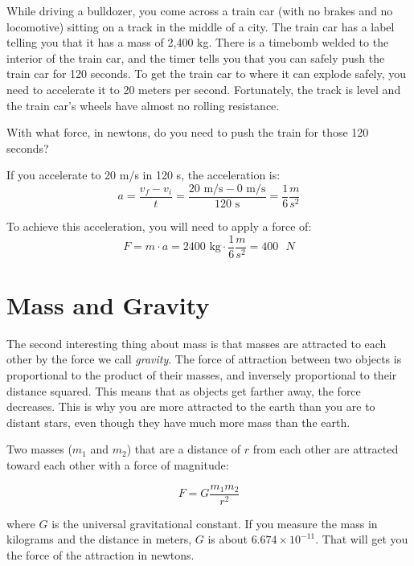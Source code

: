 \begin{Exercise}[title={Acceleration}, label=acceleration_train]

While driving a bulldozer, you come across a train car (with no brakes
and no locomotive) sitting on a track in the middle of a city. The train car
has a label telling you that it has a mass of 2,400 kg. There is a timebomb
welded to the interior of the train car, and the timer tells you that
you can safely push the train car for 120 seconds. To get the train
car to where it can explode safely, you need to accelerate it to 20 meters per
second. Fortunately, the track is level and the train car's wheels have
almost no rolling resistance.

With what force, in newtons, do you need to push the train for those 120 seconds?

\end{Exercise}
\begin{Answer}[ref=acceleration_train]
If you accelerate to 20 m/s in 120 s, the acceleration is:
$$a = \frac{v_f - v_i}{t} = \frac{20\text{ m/s} - 0\text{ m/s}}{120\text{ s}} = \frac{1}{6} \frac{m}{s^2}$$

To achieve this acceleration, you will need to apply a force of:
$$F = m \cdot a = 2400\text{ kg} \cdot \frac{1}{6} \frac{m}{s^2} = 400\text{ }N$$
\end{Answer}

\section{Mass and Gravity}

The second interesting thing about mass is that masses are
attracted to each other by the force we call \textit{gravity}. The
force of attraction between two objects is proportional to the product
of their masses, and inversely proportional to their distance squared.
This means that as objects get farther away, the force decreases.
This is why you are more attracted to the earth than you are to
distant stars, even though they have much more mass than the earth.

\begin{mdframed}[style=important, frametitle={Newton's Law of Universal Gravitation}]

Two masses ($m_1$ and $m_2$) that are a distance of
$r$ from each other are attracted toward each other with a force of
magnitude:

$$F = G\frac{m_1 m_2}{r^2}$$

where $G$ is the universal gravitational constant. If you measure the
mass in kilograms and the distance in meters, $G$ is about $6.674
\times 10^{-11}$. That will get you the force of the attraction in
newtons.

\end{mdframed}

